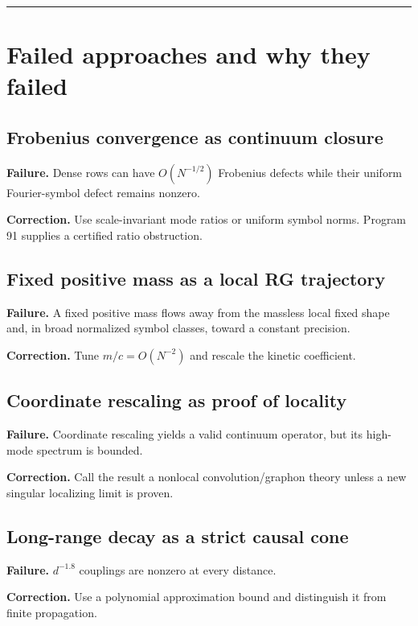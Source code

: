 \documentclass[11pt,a4paper,openany]{report}
\begin{document}
\par\medskip\hrule\medskip

\chapter{Failed approaches and why they failed}

\section{Frobenius convergence as continuum closure}

\textbf{Failure.} Dense rows can have \(O(N^{-1/2})\) Frobenius defects while their uniform Fourier-symbol defect remains nonzero.

\textbf{Correction.} Use scale-invariant mode ratios or uniform symbol norms. Program 91 supplies a certified ratio obstruction.

\section{Fixed positive mass as a local RG trajectory}

\textbf{Failure.} A fixed positive mass flows away from the massless local fixed shape and, in broad normalized symbol classes, toward a constant precision.

\textbf{Correction.} Tune \(m/c=O(N^{-2})\) and rescale the kinetic coefficient.

\section{Coordinate rescaling as proof of locality}

\textbf{Failure.} Coordinate rescaling yields a valid continuum operator, but its high-mode spectrum is bounded.

\textbf{Correction.} Call the result a nonlocal convolution/\allowbreak{}graphon theory unless a new singular localizing limit is proven.

\section{Long-range decay as a strict causal cone}

\textbf{Failure.} \(d^{-1.8}\) couplings are nonzero at every distance.

\textbf{Correction.} Use a polynomial approximation bound and distinguish it from finite propagation.
\end{document}
